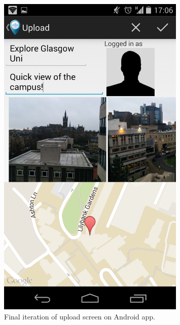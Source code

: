 \documentclass{l3proj}
\begin{document}
\newpage
\begin{figure}[ht!]
\centering
\includegraphics[width=0.8\textwidth]{images/final-upload-screen.png}
\caption{Final iteration of upload screen on Android app.}
\end{figure}

\newpage



\printglossaries
\end{document}
